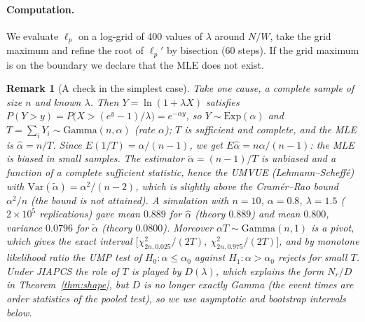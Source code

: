 \documentclass[a4paper,11pt]{article}
\newtheorem{remark}{Remark}[section]
\begin{document}
\paragraph{Computation.} We evaluate $\ell_p$ on a log-grid of 400 values of $\lambda$ around $N/W$, take the grid maximum and refine the root of $\ell_p'$ by bisection (60 steps). If the grid maximum is on the boundary we declare that the MLE does not exist.

\begin{remark}[A check in the simplest case]\label{rem:umvue}
Take one cause, a complete sample of size $n$ and known $\lambda$. Then $Y=\ln(1+\lambda X)$ satisfies $P(Y>y)=P\big(X>(e^y-1)/\lambda\big)=e^{-\alpha y}$, so $Y\sim\mathrm{Exp}(\alpha)$ and $T=\sum_iY_i\sim\mathrm{Gamma}(n,\alpha)$ (rate $\alpha$); $T$ is sufficient and complete, and the MLE is $\hat\alpha=n/T$. Since $E(1/T)=\alpha/(n-1)$, we get $E\hat\alpha=n\alpha/(n-1)$: the MLE is biased in small samples. The estimator $\tilde\alpha=(n-1)/T$ is unbiased and a function of a complete sufficient statistic, hence the UMVUE (Lehmann--Scheff\'e) with $\mathrm{Var}(\tilde\alpha)=\alpha^2/(n-2)$, which is slightly above the Cram\'er--Rao bound $\alpha^2/n$ (the bound is not attained). A simulation with $n=10$, $\alpha=0.8$, $\lambda=1.5$ ($2\times10^5$ replications) gave mean $0.889$ for $\hat\alpha$ (theory $0.889$) and mean $0.800$, variance $0.0796$ for $\tilde\alpha$ (theory $0.0800$). Moreover $\alpha T\sim\mathrm{Gamma}(n,1)$ is a pivot, which gives the exact interval $\big[\chi^2_{2n,0.025}/(2T),\ \chi^2_{2n,0.975}/(2T)\big]$, and by monotone likelihood ratio the UMP test of $H_0:\alpha\le\alpha_0$ against $H_1:\alpha>\alpha_0$ rejects for small $T$. Under JIAPCS the role of $T$ is played by $D(\lambda)$, which explains the form $N_r/D$ in Theorem~\ref{thm:shape}, but $D$ is no longer exactly Gamma (the event times are order statistics of the pooled test), so we use asymptotic and bootstrap intervals below.
\end{remark}
\end{document}
